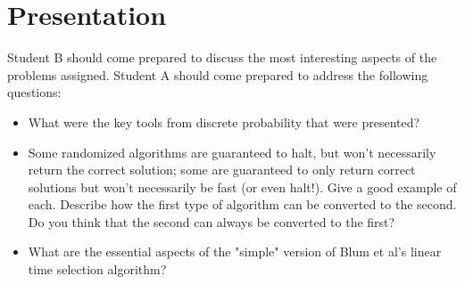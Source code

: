 \documentclass[11pt]{article}
\begin{document}
\section{Presentation}
Student B should come prepared to discuss the most interesting aspects of the problems assigned.  Student A should come prepared to address the following questions:
\begin{itemize}
\item What were the key tools from discrete probability that were presented?
\item Some randomized algorithms are guaranteed to halt, but won't necessarily return the correct solution; some are guaranteed to only return correct solutions but won't necessarily be fast (or even halt!). Give a good example of each.
Describe how the first type of algorithm can be converted to the second.  Do you think that the second can always be converted to the first?
\item What are the essential aspects of the "simple" version of Blum et al's linear time selection algorithm?
\end{itemize}
\end{document}
